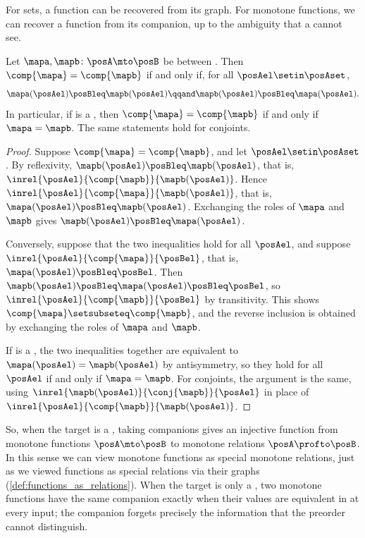 For sets, a function can be recovered from its graph.
For monotone functions, we can recover a function from its companion, up to the ambiguity that a  cannot see.

\begin{lemma}
    \label{lem:companion-determines-function}
    Let $\mapa, \mapb \colon \posA \mto \posB$ be  between .
    Then $\comp{\mapa} = \comp{\mapb}$ if and only if, for all $\posAel \setin \posAset$,
    \begin{equation}
        \mapa(\posAel) \posBleq \mapb(\posAel)
        \qqand
        \mapb(\posAel) \posBleq \mapa(\posAel).
    \end{equation}
    In particular, if \posB is a , then $\comp{\mapa} = \comp{\mapb}$ if and only if $\mapa = \mapb$.
    The same statements hold for conjoints.
\end{lemma}
\begin{proof}
    Suppose $\comp{\mapa} = \comp{\mapb}$, and let $\posAel \setin \posAset$.
    By reflexivity, $\mapb(\posAel) \posBleq \mapb(\posAel)$, that is, $\inrel{\posAel}{\comp{\mapb}}{\mapb(\posAel)}$.
    Hence $\inrel{\posAel}{\comp{\mapa}}{\mapb(\posAel)}$, that is, $\mapa(\posAel) \posBleq \mapb(\posAel)$.
    Exchanging the roles of $\mapa$ and $\mapb$ gives $\mapb(\posAel) \posBleq \mapa(\posAel)$.

    Conversely, suppose that the two inequalities hold for all $\posAel$, and suppose $\inrel{\posAel}{\comp{\mapa}}{\posBel}$, that is, $\mapa(\posAel) \posBleq \posBel$.
    Then $\mapb(\posAel) \posBleq \mapa(\posAel) \posBleq \posBel$, so $\inrel{\posAel}{\comp{\mapb}}{\posBel}$ by transitivity.
    This shows $\comp{\mapa} \setsubseteq \comp{\mapb}$, and the reverse inclusion is obtained by exchanging the roles of $\mapa$ and $\mapb$.

    If \posB is a , the two inequalities together are equivalent to $\mapa(\posAel) = \mapb(\posAel)$ by antisymmetry, so they hold for all $\posAel$ if and only if $\mapa = \mapb$.
    For conjoints, the argument is the same, using $\inrel{\mapb(\posAel)}{\conj{\mapb}}{\posAel}$ in place of $\inrel{\posAel}{\comp{\mapb}}{\mapb(\posAel)}$.
\end{proof}

So, when the target is a , taking companions gives an injective function from monotone functions $\posA \mto \posB$ to monotone relations $\posA \profto \posB$.
In this sense we can view monotone functions as special monotone relations, just as we viewed functions as special relations via their graphs (\cref{def:functions_as_relations}).
When the target is only a , two monotone functions have the same companion exactly when their values are equivalent in \posB at every input; the companion forgets precisely the information that the preorder cannot distinguish.

